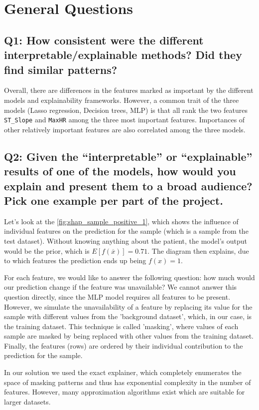 \section*{General Questions}

\subsection*{Q1: How consistent were the different interpretable/explainable methods? Did they find similar patterns?}

Overall, there are differences in the features marked as important by the different models and explainability frameworks. However, a common trait of the three models (Lasso regression, Decision trees, MLP) is that all rank the two features \texttt{ST\_Slope} and \texttt{MaxHR} among the three most important features. Importances of other relatively important features are also correlated among the three models.

\subsection*{Q2: Given the “interpretable” or “explainable” results of one of the models, how would you explain and present them to a broad audience? Pick one example per part of the project.}
Let's look at the \autoref{fig:shap_sample_positive_1}, which shows the influence of individual features on the prediction for the sample (which is a sample from the test dataset). Without knowing anything about the patient, the model's output would be the prior, which is $E[f(\overline{x})] = 0.71$. The diagram then explains, due to which features the prediction ends up being $f(x)=1$.

For each feature, we would like to answer the following question: how much would our prediction change if the feature was unavailable? We cannot answer this question directly, since the MLP model requires all features to be present. However, we simulate the unavailability of a feature by replacing its value for the sample with different values from the 'background dataset', which, in our case, is the training dataset.
This technique is called 'masking', where values of each sample are masked by being replaced with other values from the training dataset.
Finally, the features (rows) are ordered by their individual contribution to the prediction for the sample.

In our solution we used the exact explainer, which completely enumerates the space of masking patterns and thus has exponential complexity in the number of features. However, many approximation algorithms exist which are suitable for larger datasets.


